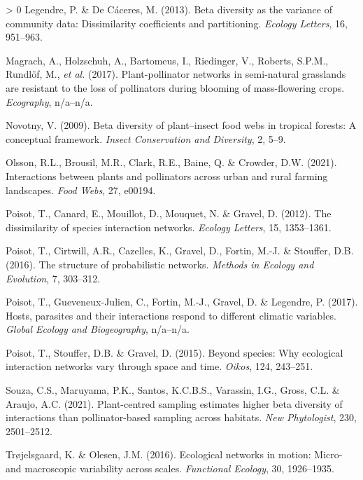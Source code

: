 \documentclass[11pt]{article}
\newlength{\cslhangindent}
\newenvironment{CSLReferences}[3] %
 {%
  \setlength{\parindent}{0pt}
  \ifodd #1 \everypar{\setlength{\hangindent}{\cslhangindent}}\ignorespaces\fi
  \ifnum #2 > 0
  \setlength{\parskip}{#2\baselineskip}
  \fi
 }%
 {}
\begin{document}
\begin{CSLReferences}{1}{0}
\leavevmode\hypertarget{ref-Legendre2013BetDiv}{}%
Legendre, P. \& De Cáceres, M. (2013). Beta diversity as the variance of
community data: Dissimilarity coefficients and partitioning.
\emph{Ecology Letters}, 16, 951--963.

\leavevmode\hypertarget{ref-Magrach2017PlaNet}{}%
Magrach, A., Holzschuh, A., Bartomeus, I., Riedinger, V., Roberts,
S.P.M., Rundlöf, M., \emph{et al.} (2017). Plant-pollinator networks in
semi-natural grasslands are resistant to the loss of pollinators during
blooming of mass-flowering crops. \emph{Ecography}, n/a--n/a.

\leavevmode\hypertarget{ref-Novotny2009BetDiv}{}%
Novotny, V. (2009). Beta diversity of plant--insect food webs in
tropical forests: A conceptual framework. \emph{Insect Conservation and
Diversity}, 2, 5--9.

\leavevmode\hypertarget{ref-Olsson2021IntPla}{}%
Olsson, R.L., Brousil, M.R., Clark, R.E., Baine, Q. \& Crowder, D.W.
(2021). Interactions between plants and pollinators across urban and
rural farming landscapes. \emph{Food Webs}, 27, e00194.

\leavevmode\hypertarget{ref-Poisot2012DisSpe}{}%
Poisot, T., Canard, E., Mouillot, D., Mouquet, N. \& Gravel, D. (2012).
The dissimilarity of species interaction networks. \emph{Ecology
Letters}, 15, 1353--1361.

\leavevmode\hypertarget{ref-Poisot2016StrPro}{}%
Poisot, T., Cirtwill, A.R., Cazelles, K., Gravel, D., Fortin, M.-J. \&
Stouffer, D.B. (2016). The structure of probabilistic networks.
\emph{Methods in Ecology and Evolution}, 7, 303--312.

\leavevmode\hypertarget{ref-Poisot2017HosPar}{}%
Poisot, T., Gueveneux-Julien, C., Fortin, M.-J., Gravel, D. \& Legendre,
P. (2017). Hosts, parasites and their interactions respond to different
climatic variables. \emph{Global Ecology and Biogeography}, n/a--n/a.

\leavevmode\hypertarget{ref-Poisot2015SpeWhy}{}%
Poisot, T., Stouffer, D.B. \& Gravel, D. (2015). Beyond species: Why
ecological interaction networks vary through space and time.
\emph{Oikos}, 124, 243--251.

\leavevmode\hypertarget{ref-Souza2021PlaSam}{}%
Souza, C.S., Maruyama, P.K., Santos, K.C.B.S., Varassin, I.G., Gross,
C.L. \& Araujo, A.C. (2021). Plant-centred sampling estimates higher
beta diversity of interactions than pollinator-based sampling across
habitats. \emph{New Phytologist}, 230, 2501--2512.

\leavevmode\hypertarget{ref-Trojelsgaard2016EcoNet}{}%
Trøjelsgaard, K. \& Olesen, J.M. (2016). Ecological networks in motion:
Micro- and macroscopic variability across scales. \emph{Functional
Ecology}, 30, 1926--1935.


\end{CSLReferences}
\end{document}
